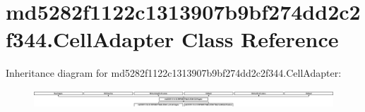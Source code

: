 \hypertarget{classmd5282f1122c1313907b9bf274dd2c2f344_1_1CellAdapter}{}\section{md5282f1122c1313907b9bf274dd2c2f344.\+Cell\+Adapter Class Reference}
\label{classmd5282f1122c1313907b9bf274dd2c2f344_1_1CellAdapter}
Inheritance diagram for md5282f1122c1313907b9bf274dd2c2f344.\+Cell\+Adapter\+:\begin{figure}[H]
\begin{center}
\leavevmode
\includegraphics[height=0.684597cm]{classmd5282f1122c1313907b9bf274dd2c2f344_1_1CellAdapter}
\end{center}
\end{figure}
